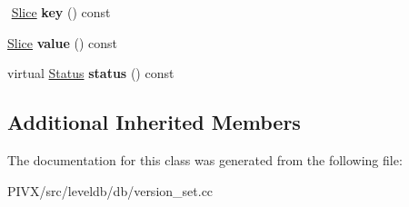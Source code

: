 \begin{DoxyCompactItemize}
$$\mbox{\label{classleveldb_1_1_version_1_1_level_file_num_iterator_af89babdc6efb44a125b9ec597fc96bd8}} 
\mbox{\hyperlink{classleveldb_1_1_slice}{Slice}} {\bfseries key} () const
\item 
\mbox{\label{classleveldb_1_1_version_1_1_level_file_num_iterator_af7b7da923a316d8b85f7194c926470db}} 
\mbox{\hyperlink{classleveldb_1_1_slice}{Slice}} {\bfseries value} () const
\item 
\mbox{\label{classleveldb_1_1_version_1_1_level_file_num_iterator_a173217ee0e689944ba052b1d07d2e58a}} 
virtual \mbox{\hyperlink{classleveldb_1_1_status}{Status}} {\bfseries status} () const
\end{DoxyCompactItemize}
\subsection*{Additional Inherited Members}


The documentation for this class was generated from the following file\+:\begin{DoxyCompactItemize}
\item 
P\+I\+V\+X/src/leveldb/db/version\+\_\+set.\+cc\end{DoxyCompactItemize}
